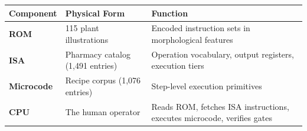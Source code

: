 \begin{longtable}[]{@{}lll@{}}
\toprule
\begin{minipage}[b]{0.29\columnwidth}\raggedright
Component\strut
\end{minipage} & \begin{minipage}[b]{0.37\columnwidth}\raggedright
Physical Form\strut
\end{minipage} & \begin{minipage}[b]{0.26\columnwidth}\raggedright
Function\strut
\end{minipage}\tabularnewline
\midrule
\endhead
\begin{minipage}[t]{0.29\columnwidth}\raggedright
\textbf{ROM}\strut
\end{minipage} & \begin{minipage}[t]{0.37\columnwidth}\raggedright
115 plant illustrations\strut
\end{minipage} & \begin{minipage}[t]{0.26\columnwidth}\raggedright
Encoded instruction sets in morphological features\strut
\end{minipage}\tabularnewline
\begin{minipage}[t]{0.29\columnwidth}\raggedright
\textbf{ISA}\strut
\end{minipage} & \begin{minipage}[t]{0.37\columnwidth}\raggedright
Pharmacy catalog (1,491 entries)\strut
\end{minipage} & \begin{minipage}[t]{0.26\columnwidth}\raggedright
Operation vocabulary, output registers, execution tiers\strut
\end{minipage}\tabularnewline
\begin{minipage}[t]{0.29\columnwidth}\raggedright
\textbf{Microcode}\strut
\end{minipage} & \begin{minipage}[t]{0.37\columnwidth}\raggedright
Recipe corpus (1,076 entries)\strut
\end{minipage} & \begin{minipage}[t]{0.26\columnwidth}\raggedright
Step-level execution primitives\strut
\end{minipage}\tabularnewline
\begin{minipage}[t]{0.29\columnwidth}\raggedright
\textbf{CPU}\strut
\end{minipage} & \begin{minipage}[t]{0.37\columnwidth}\raggedright
The human operator\strut
\end{minipage} & \begin{minipage}[t]{0.26\columnwidth}\raggedright
Reads ROM, fetches ISA instructions, executes microcode, verifies
gates\strut
\end{minipage}\tabularnewline
\bottomrule
\end{longtable}


